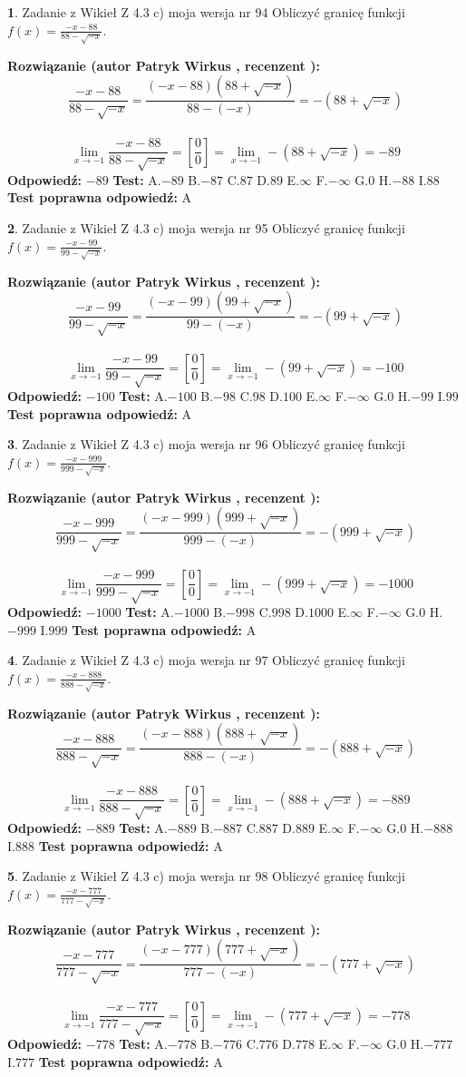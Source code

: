 \documentclass[12pt, a4paper]{article}
\theoremstyle{definition} %
\newtheorem{zad}{}
\newcommand{\zadStart}[1]{\begin{zad}#1\newline}
\newcommand{\zadStop}{\end{zad}}
\newcommand{\rozwStart}[2]{\noindent \textbf{Rozwiązanie (autor #1 , recenzent #2): }\newline}
\newcommand{\rozwStop}{\newline}
\newcommand{\odpStart}{\noindent \textbf{Odpowiedź:}\newline}
\newcommand{\odpStop}{\newline}
\newcommand{\testStart}{\noindent \textbf{Test:}\newline}
\newcommand{\testStop}{\newline}
\newcommand{\kluczStart}{\noindent \textbf{Test poprawna odpowiedź:}\newline}
\newcommand{\kluczStop}{\newline}
\begin{document}
\zadStart{Zadanie z Wikieł Z 4.3 c) moja wersja nr 94}
Obliczyć granicę funkcji $f(x)=\frac{-x-88}{88-\sqrt{-x}}$.
\zadStop
\rozwStart{Patryk Wirkus}{}
$$\frac{-x-88}{88-\sqrt{-x}}=\frac{(-x-88)(88+\sqrt{-x})}{88-(-x)}=-(88+\sqrt{-x})$$
\\
$$\lim\limits_{x\to-1}\frac{-x-88}{88-\sqrt{-x}}=[\frac{0}{0}]=\lim\limits_{x\to-1}-(88+\sqrt{-x}) =-89$$
\rozwStop
\odpStart
$-89$
\odpStop
\testStart
A.$-89$
B.$-87$
C.$87$
D.$89$
E.$\infty$
F.$-\infty$
G.$0$
H.$-88$
I.$88$
\testStop
\kluczStart
A
\kluczStop



\zadStart{Zadanie z Wikieł Z 4.3 c) moja wersja nr 95}
Obliczyć granicę funkcji $f(x)=\frac{-x-99}{99-\sqrt{-x}}$.
\zadStop
\rozwStart{Patryk Wirkus}{}
$$\frac{-x-99}{99-\sqrt{-x}}=\frac{(-x-99)(99+\sqrt{-x})}{99-(-x)}=-(99+\sqrt{-x})$$
\\
$$\lim\limits_{x\to-1}\frac{-x-99}{99-\sqrt{-x}}=[\frac{0}{0}]=\lim\limits_{x\to-1}-(99+\sqrt{-x}) =-100$$
\rozwStop
\odpStart
$-100$
\odpStop
\testStart
A.$-100$
B.$-98$
C.$98$
D.$100$
E.$\infty$
F.$-\infty$
G.$0$
H.$-99$
I.$99$
\testStop
\kluczStart
A
\kluczStop



\zadStart{Zadanie z Wikieł Z 4.3 c) moja wersja nr 96}
Obliczyć granicę funkcji $f(x)=\frac{-x-999}{999-\sqrt{-x}}$.
\zadStop
\rozwStart{Patryk Wirkus}{}
$$\frac{-x-999}{999-\sqrt{-x}}=\frac{(-x-999)(999+\sqrt{-x})}{999-(-x)}=-(999+\sqrt{-x})$$
\\
$$\lim\limits_{x\to-1}\frac{-x-999}{999-\sqrt{-x}}=[\frac{0}{0}]=\lim\limits_{x\to-1}-(999+\sqrt{-x}) =-1000$$
\rozwStop
\odpStart
$-1000$
\odpStop
\testStart
A.$-1000$
B.$-998$
C.$998$
D.$1000$
E.$\infty$
F.$-\infty$
G.$0$
H.$-999$
I.$999$
\testStop
\kluczStart
A
\kluczStop



\zadStart{Zadanie z Wikieł Z 4.3 c) moja wersja nr 97}
Obliczyć granicę funkcji $f(x)=\frac{-x-888}{888-\sqrt{-x}}$.
\zadStop
\rozwStart{Patryk Wirkus}{}
$$\frac{-x-888}{888-\sqrt{-x}}=\frac{(-x-888)(888+\sqrt{-x})}{888-(-x)}=-(888+\sqrt{-x})$$
\\
$$\lim\limits_{x\to-1}\frac{-x-888}{888-\sqrt{-x}}=[\frac{0}{0}]=\lim\limits_{x\to-1}-(888+\sqrt{-x}) =-889$$
\rozwStop
\odpStart
$-889$
\odpStop
\testStart
A.$-889$
B.$-887$
C.$887$
D.$889$
E.$\infty$
F.$-\infty$
G.$0$
H.$-888$
I.$888$
\testStop
\kluczStart
A
\kluczStop



\zadStart{Zadanie z Wikieł Z 4.3 c) moja wersja nr 98}
Obliczyć granicę funkcji $f(x)=\frac{-x-777}{777-\sqrt{-x}}$.
\zadStop
\rozwStart{Patryk Wirkus}{}
$$\frac{-x-777}{777-\sqrt{-x}}=\frac{(-x-777)(777+\sqrt{-x})}{777-(-x)}=-(777+\sqrt{-x})$$
\\
$$\lim\limits_{x\to-1}\frac{-x-777}{777-\sqrt{-x}}=[\frac{0}{0}]=\lim\limits_{x\to-1}-(777+\sqrt{-x}) =-778$$
\rozwStop
\odpStart
$-778$
\odpStop
\testStart
A.$-778$
B.$-776$
C.$776$
D.$778$
E.$\infty$
F.$-\infty$
G.$0$
H.$-777$
I.$777$
\testStop
\kluczStart
A
\kluczStop
\end{document}
